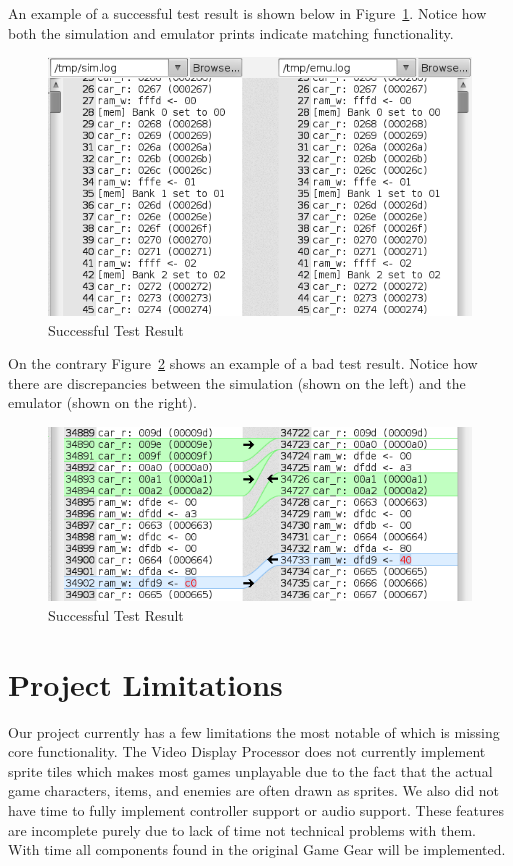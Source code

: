 \documentclass{article}
\begin{document}
An example of a successful test result is shown below in
Figure~\ref{fig:diff_good}. Notice how both the simulation and emulator prints
indicate matching functionality.

\begin{figure}[H]
\centering
\includegraphics[scale=0.4]{../images/diff_good.png}
\caption{Successful Test Result}
\label{fig:diff_good}
\end{figure}

On the contrary Figure~\ref{fig:diff_bad} shows an example of a bad test
result. Notice how there are discrepancies between the simulation (shown on the left) and the
emulator (shown on the right).

\begin{figure}[H]
\centering
\includegraphics[scale=0.4]{../images/diff_bad.png}
\caption{Successful Test Result}
\label{fig:diff_bad}
\end{figure}
\section{Project Limitations}

Our project currently has a few limitations the most notable of which is
missing core functionality.  The Video Display Processor does not currently
implement sprite tiles which makes most games unplayable due to the fact
that the actual game characters, items, and enemies are often drawn as sprites.
We also did not have time to fully implement controller support or audio
support. These features are incomplete purely due to lack of time not technical
problems with them. With time all components found in the original Game Gear
will be implemented.
\end{document}
